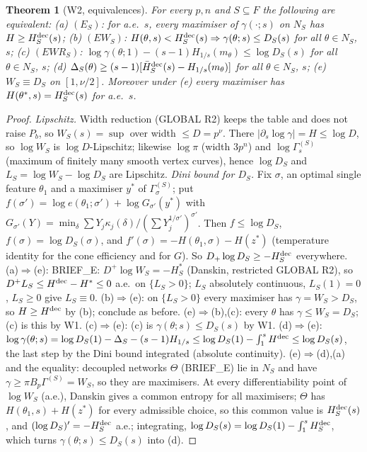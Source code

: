 \documentclass[11pt]{article}
\newtheorem{theorem}{Theorem}\newtheorem{lemma}[theorem]{Lemma}\newtheorem{corollary}[theorem]{Corollary}
\theoremstyle{remark}\newtheorem{remark}[theorem]{Remark}
\newcommand{\Hr}{H_{1/s}}
\begin{document}
\begin{theorem}[W2, equivalences]\label{W2}
For every $p,n$ and $S\subseteq F$ the following are equivalent:
(a) $(E_S)$: for a.e.\ $s$, every maximiser of $\gamma(\cdot;s)$ on $N_S$ has $H\ge H^{\rm dec}_S(s)$;
(b) $(EW_S)$: $H(\theta,s)<H^{\rm dec}_S(s)\Rightarrow\gamma(\theta;s)\le D_S(s)$ for all $\theta\in N_S$, $s$;
(c) $(EWR_S)$: $\log\gamma(\theta;1)-(s-1)\Hr(m_\theta)\le\log D_S(s)$ for all $\theta\in N_S$, $s$;
(d) $\Delta_S(\theta)\ge(s-1)[\bar H^{\rm dec}_S(s)-\Hr(m_\theta)]$ for all $\theta\in N_S$, $s$;
(e) $W_S\equiv D_S$ on $[1,\nu/2]$.
Moreover under (e) every maximiser has $H(\theta^*,s)=H^{\rm dec}_S(s)$ for a.e.\ $s$.
\end{theorem}
\begin{proof}
\emph{Lipschitz.} Width reduction (GLOBAL R2) keeps the table and does not raise $P_b$, so $W_S(s)=\sup$ over width $\le D=p^{\nu}$.
There $|\partial_s\log\gamma|=H\le\log D$, so $\log W_S$ is $\log D$-Lipschitz; likewise $\log\pi$ (width $3p^n$) and $\log\Gamma^{(S)}_s$
(maximum of finitely many smooth vertex curves), hence $\log D_S$ and $L_S=\log W_S-\log D_S$ are Lipschitz.
\emph{Dini bound for $D_S$.} Fix $\sigma$, an optimal single feature $\theta_1$ and a maximiser $y^*$ of $\Gamma^{(S)}_\sigma$; put
$f(\sigma')=\log e(\theta_1;\sigma')+\log G_{\sigma'}(y^*)$ with $G_{\sigma'}(Y)=\min_\delta\sum Y_j\kappa_j(\delta)/(\sum Y_j^{1/\sigma'})^{\sigma'}$.
Then $f\le\log D_S$, $f(\sigma)=\log D_S(\sigma)$, and $f'(\sigma)=-H(\theta_1,\sigma)-H(z^*)$ (temperature identity for the cone efficiency and
for $G$). So $D_+\log D_S\ge-H^{\rm dec}_S$ everywhere.
(a)$\Rightarrow$(e): BRIEF\_E: $D^+\log W_S=-H^*_S$ (Danskin, restricted GLOBAL R2), so $D^+L_S\le H^{\rm dec}-H^*\le0$ a.e.\ on $\{L_S>0\}$;
$L_S$ absolutely continuous, $L_S(1)=0$, $L_S\ge0$ give $L_S\equiv0$.
(b)$\Rightarrow$(e): on $\{L_S>0\}$ every maximiser has $\gamma=W_S>D_S$, so $H\ge H^{\rm dec}$ by (b); conclude as before.
(e)$\Rightarrow$(b),(c): every $\theta$ has $\gamma\le W_S=D_S$; (c) is this by W1.
(c)$\Rightarrow$(e): (c) is $\gamma(\theta;s)\le D_S(s)$ by W1.
(d)$\Rightarrow$(e): $\log\gamma(\theta;s)=\log D_S(1)-\Delta_S-(s-1)\Hr\le\log D_S(1)-\int_1^sH^{\rm dec}\le\log D_S(s)$, the last step
by the Dini bound integrated (absolute continuity).
(e)$\Rightarrow$(d),(a) and the equality: decoupled networks $\Theta$ (BRIEF\_E) lie in $N_S$ and have $\gamma\ge\pi B_p\Gamma^{(S)}=W_S$, so they
are maximisers. At every differentiability point of $\log W_S$ (a.e.), Danskin gives a common entropy for all maximisers; $\Theta$ has
$H(\theta_1,s)+H(z^*)$ for every admissible choice, so this common value is $H^{\rm dec}_S(s)$, and
$(\log D_S)'=-H^{\rm dec}_S$ a.e.; integrating, $\log D_S(s)=\log D_S(1)-\int_1^sH^{\rm dec}_S$, which turns $\gamma(\theta;s)\le D_S(s)$ into (d).
\end{proof}
\end{document}
